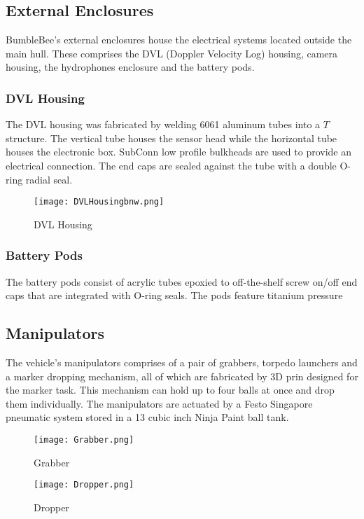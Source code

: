 \documentclass[journal,12pt]{IEEEtran}
\begin{document}
\subsection{External Enclosures}
BumbleBee's external enclosures house the electrical systems located outside the main hull. These comprises the DVL (Doppler Velocity Log) housing, camera housing, the hydrophones enclosure and the battery pods. \\

\subsubsection{DVL Housing}
The DVL housing was fabricated by welding 6061 aluminum tubes into a $T$ structure. The vertical tube houses the sensor head while the horizontal tube houses the electronic box. SubConn low profile bulkheads are used to provide an electrical connection. The end caps are sealed against the tube with a double O-ring radial seal. \\

\begin{figure}[h]
\centering
\texttt{[image: DVLHousingbnw.png]}
\caption{DVL Housing}
\end{figure}

\subsubsection{Battery Pods}
The battery pods consist of acrylic tubes epoxied to off-the-shelf screw on/off end caps that are integrated with O-ring seals. The pods feature titanium pressure 

\subsection{Manipulators}
The vehicle's manipulators comprises of a pair of grabbers, torpedo launchers and a marker dropping mechanism, all of which are fabricated by 3D prin designed for the marker task. This mechanism can hold up to four balls at once and drop them individually. The manipulators are actuated by a Festo Singapore pneumatic system stored in a 13 cubic inch Ninja Paint ball tank.

\begin{figure}[h]
\centering
\texttt{[image: Grabber.png]}
\caption{Grabber}
\end{figure}

\begin{figure}[h]
\centering
\texttt{[image: Dropper.png]}
\caption{Dropper}
\end{figure}
\end{document}
